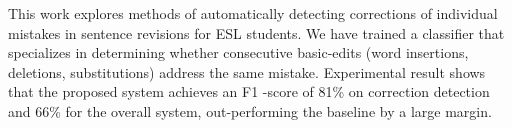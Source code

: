 This work explores methods of automatically detecting corrections of individual mistakes in sentence revisions for ESL students. We have trained a classifier that specializes in determining whether consecutive basic-edits (word insertions, deletions, substitutions) address the same mistake. Experimental result shows that the proposed system achieves an F1 -score of 81\% on correction detection and 66\% for the overall system, out-performing the baseline by a large margin.

